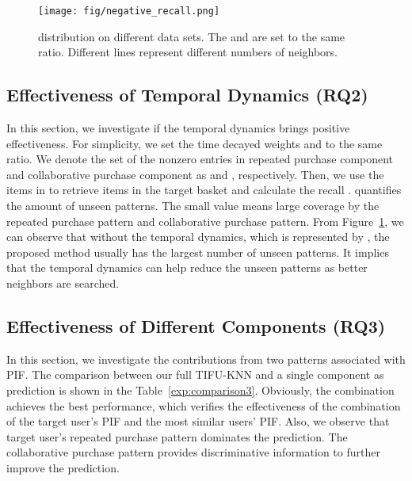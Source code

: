 \documentclass[sigconf]{acmart}
\begin{document}
\begin{figure}[!t]
\centerline{\texttt{[image: fig/negative\_recall.png]}}
\caption{ distribution on different data sets. The  and  are set to the same ratio. Different lines represent different numbers of neighbors.}
\label{fig:neg_recall}
\end{figure}

\subsection{Effectiveness of Temporal Dynamics (RQ2)}

In this section, we  investigate if the temporal  dynamics brings positive effectiveness. For  simplicity, we set the time decayed weights  and  to the same ratio. We  denote the set of the nonzero entries in repeated purchase component and collaborative purchase component as  and , respectively. Then, we use  the items in  to retrieve items in the target basket and calculate the recall .  quantifies  the amount of unseen patterns. The small value  means large coverage by the repeated purchase pattern and collaborative purchase pattern. From 
Figure~\ref{fig:neg_recall}, we can observe that without the temporal dynamics, which is represented by ,  the proposed method usually has the largest number of unseen patterns. It implies that the temporal dynamics can help reduce the unseen patterns as better neighbors are searched.




\subsection{Effectiveness of Different Components (RQ3)}
In this section, we investigate the  contributions from two patterns associated with PIF.  The  comparison between  our full TIFU-KNN and a single component as prediction is shown in the Table~\ref{exp:comparison3}. Obviously, the combination achieves the best performance, which verifies the effectiveness of the  combination of  the target user's  PIF and  the most similar users' PIF. Also, we  observe that target user's repeated purchase  pattern dominates the  prediction. The  collaborative  purchase pattern provides   discriminative information to further improve the prediction. 
\end{document}
